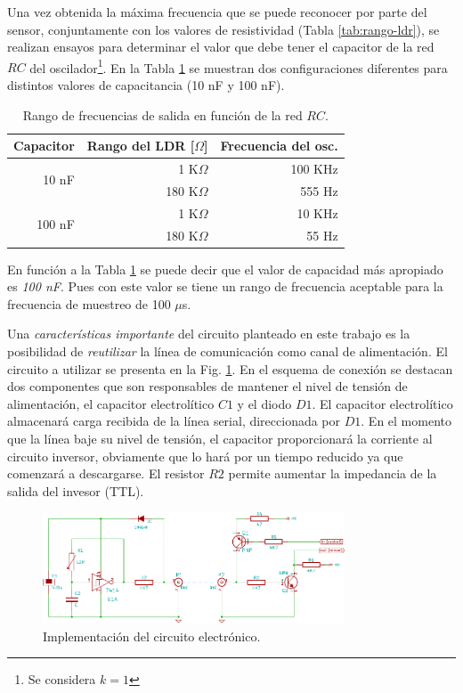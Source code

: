 \documentclass[11pt,a4paper,oneside]{article}
\begin{document}
Una vez obtenida la máxima frecuencia que se puede reconocer por parte del sensor, conjuntamente con los valores de resistividad (Tabla \ref{tab:rango-ldr}), se realizan ensayos para determinar el valor que debe tener el capacitor de la red $RC$ del oscilador\footnote{Se considera $k = 1$}. En la Tabla \ref{tab:freq-dif-cap} se muestran dos configuraciones diferentes para distintos valores de capacitancia (10 nF y 100 nF).

\begin{table}[h]
  \centering
  \begin{tabular}[h]{|r|r|r|}
    \hline
    \textbf{Capacitor} & \textbf{Rango del LDR [$\Omega$]} & \textbf{Frecuencia del osc.} \\
    \hline
    \multirow{2}{*}{10 nF}  & 1 K$\Omega$   & 100 KHz \\
                            & 180 K$\Omega$ & 555 Hz  \\
    \hline
    \multirow{2}{*}{100 nF} & 1 K$\Omega$   & 10 KHz  \\
                            & 180 K$\Omega$ & 55 Hz   \\
    \hline
  \end{tabular}
  \caption{Rango de frecuencias de salida en función de la red $RC$.}
  \label{tab:freq-dif-cap}
\end{table}

En función a la Tabla \ref{tab:freq-dif-cap} se puede decir que el valor de capacidad más apropiado es \emph{100 nF}. Pues con este valor se tiene un rango de frecuencia aceptable para la frecuencia de muestreo de 100 $\mu$s. 

Una \emph{características importante} del circuito planteado en este trabajo es la posibilidad de \emph{reutilizar} la línea de comunicación como canal de alimentación. El circuito a utilizar se presenta en la Fig. \ref{fig:hw-placa-sensor}. En el esquema de conexión se destacan dos componentes que son responsables de mantener el nivel de tensión de alimentación, el capacitor electrolítico $C1$ y el diodo $D1$. El capacitor electrolítico almacenará carga recibida de la línea serial, direccionada por $D1$. En el momento que la línea baje su nivel de tensión, el capacitor proporcionará la corriente al circuito inversor, obviamente que lo hará por un tiempo reducido ya que comenzará a descargarse. El resistor $R2$ permite aumentar la impedancia de la salida del invesor (TTL). 

\begin{figure}[ht]
  \centering
  \includegraphics[width=0.8\textwidth]{images/placa_sensor}
  \caption{Implementación del circuito electrónico.}
  \label{fig:hw-placa-sensor}
\end{figure}
\end{document}

